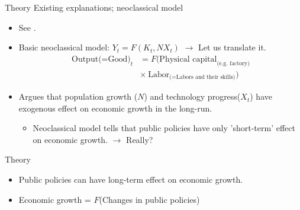 \documentclass[xcolor=dvipsnames, t]{beamer}
\begin{document}
	\begin{frame}[fragile]{Theory}
		Existing explanations; neoclassical model
		\begin{itemize}
			\item See \citet[S129-S133]{king:rebelo:1990}.
			\item Basic neoclassical model: $Y_t = F(K_{t}, NX_{t})$ \pause $\rightarrow$ Let us translate it. \pause
			\begin{equation*}
				\begin{aligned}
					\text{Output(=Good)}_{t}&=F(\text{Physical capital}_{\text{(e.g. factory)}}\\ 
					&\times\:\text{Labor}_{\text{(=Labors and their skills)}})
				\end{aligned}
			\end{equation*} \pause
			\item Argues that population growth ($N$) and technology progress($X_t$) have exogenous effect on economic growth in the long-run. \pause
			\begin{itemize}
				\item Neoclassical model tells that public policies have only 'short-term' effect on economic growth. $\rightarrow$ Really?
			\end{itemize}
		\end{itemize}
	\end{frame}
	
	\begin{frame}[fragile]{Theory}
		\citet{king:rebelo:1990}
		\begin{itemize}
			\item Public policies can have long-term effect on economic growth.
			\item Economic growth = $F$(Changes in public policies)
		\end{itemize}
	\end{frame}
	
\end{document}
